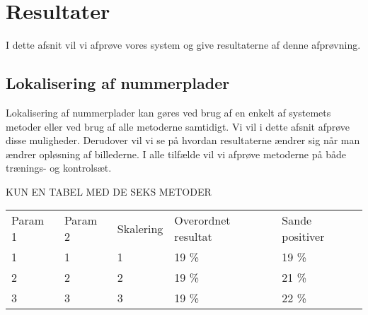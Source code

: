 \section{Resultater}
\label{sec:resultater}

I dette afsnit vil vi afprøve vores system og give resultaterne af denne afprøvning.






\subsection{Lokalisering af nummerplader}
Lokalisering af nummerplader kan gøres ved brug af en enkelt af systemets metoder eller ved brug af alle metoderne samtidigt. Vi vil i dette afsnit afprøve disse muligheder. Derudover vil vi se på hvordan resultaterne ændrer sig når man ændrer opløsning af billederne. I alle tilfælde vil vi afprøve metoderne på både trænings- og kontrolsæt. 

KUN EN TABEL MED DE SEKS METODER

\begin{tabular}{|l|l|l|l|l|}
\hline
\rowcolor[gray]{0.9} \multicolumn{5}{|>{\columncolor[gray]{0.9}}c|}{\textbf{Træningssæt}} \\ \hline
Param 1 & Param 2 & Skalering & Overordnet resultat & Sande positiver\\ \hline
1 & 1 & 1 & 19 \% & 19 \%\\ \hline
2 & 2 & 2 & 19 \% & 21 \% \\ \hline
3 & 3 & 3 & 19 \% & 22 \% \\
\hline
\end{tabular}

